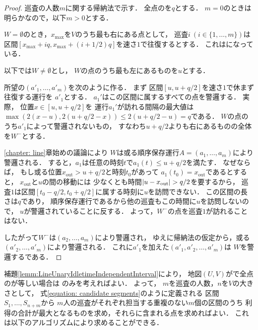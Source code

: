 \begin{proof}
  \newcommand{\leftmostpoint}{u}  %
  \newcommand{\leftmostpatroller}{巡査1}

  巡査の人数$m$に関する帰納法で示す．
  全点の{\maxIdletime}を$q$とする．
  $m = 0$のときは明らかなので，以下$m > 0$とする．

  $W = \emptyset$のとき，$x_{\max}$を$V$のうち最も右にある点として，
  巡査$i\ (i \in \{ 1, \ldots, m \})$は
  区間$[x_{\max} + iq, x_{\max} + (i + 1/2)q]$を速さ$1$で往復するとする．
  これは{\sepSectPatroll}になっている．

  以下では$W \neq \emptyset$とし，
  $W$の点のうち最も左にあるものを$\leftmostpoint$とする．

  所望の{\sepSectPatroll}$(a' _1, \dots, a' _m)$を次のように作る．
  まず
  区間$[\leftmostpoint, \leftmostpoint + q/2]$を速さ$1$で休まず往復する運行を
  $a' _1$とする．
  $a_1'$はこの区間に属するすべての点を警邏する．
  実際，
  位置$x \in [u, u + q/2]$を
  運行$a_1'$が訪れる間隔の最大値は
  $ \max( 2(x - \leftmostpoint), 2(\leftmostpoint + q/2 - x) )
    \leq 2(\leftmostpoint + q/2 - \leftmostpoint) = q$である．
  $W$の点のうち$a' _1$によって警邏されないもの，
  すなわち$u + q / 2$よりも右にあるものの全体を$W^-$とする．

  \ref{chapter: line}章始めの議論により
  $W$は或る順序保存運行$A = (a_1, \ldots, a_m)$により警邏される．
  すると，$a_1$は任意の時刻$t$で$a_1(t) \leq u + q/2$を満たす．
  \newcommand{\vout}{x_{\mathrm{out}}}
  なぜならば，
  もし或る位置$\vout > u + q/2$と時刻$t_0$があって
  $a_1(t_0) = \vout$であるとすると，
  $\vout$と$u$の間の移動には
  少なくとも時間$\abs{u - \vout} > q / 2$を要するから，
  巡査$1$は区間$[t_0 - q / 2, t_0 + q / 2]$に属する時刻に$u$を訪問できない．
  この区間の長さは$q$であり，
  順序保存運行であるから他の巡査もこの時間に$u$を訪問しないので，
  $u$が警邏されていることに反する．
  よって，$W^-$の点を巡査$1$が訪れることはない．

  したがって$W^-$は$(a _2, \ldots, a _m)$により警邏され，
  ゆえに帰納法の仮定から，或る{\sepSectPatroll}$(a' _2, \ldots, a' _m)$により警邏される．
  これに$a' _1$を加えた$(a' _1, a' _2, \dots, a' _m)$は
  $W$を警邏する{\sepSectPatroll}である．
\end{proof}


補題\ref{lemm:LineUnaryIdletimeIndependentInterval}により，
地図$(U, V)$が{\graphLine}で全点の{\maxIdletime}が等しい場合は
{\sepSectPatroll}のみを考えればよい．
よって，
$m$を巡査の人数，$n$を$V$の大きさとして，
式\eqref{equation: candidate segments}のように定義される
区間$S_1, \ldots, S_{n + m}$から
$m$人の巡査がそれぞれ担当する重複のない$m$個の区間のうち
利得の合計が最大となるものを求め，それらに含まれる点を求めればよい．
これは以下のアルゴリズムにより求めることができる．


